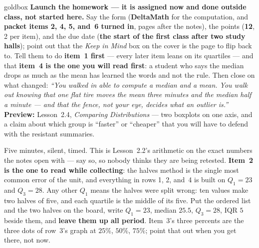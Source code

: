 \documentclass[10pt]{article}
\begin{document}
\boxguard
\begin{skillbox}{goldbox}
\textbf{Launch the homework --- it is assigned now and done outside class, not started here.}
Say the form (\textbf{DeltaMath} for the computation, and \textbf{packet items 2, 4, 5,
and~6 turned in}, pages after the notes), the points (\textbf{12}, 2 per
item), and the due date (\textbf{the start of the first class after two study halls}); point
out that the \emph{Keep in Mind} box on the cover is the page to flip back to. Tell them to do
\textbf{item~1 first} --- every later item leans on its quartiles --- and that \textbf{item~4 is
the one you will read first}: a student who says the median drops as much as the mean has
learned the words and not the rule. Then close on what changed: \emph{``You walked in able to
compute a median and a mean. You walk out knowing that one flat tire moves the mean three
minutes and the median half a minute --- and that the fence, not your eye, decides what an
outlier is.''} \textbf{Preview:} Lesson~2.4, \emph{Comparing Distributions} --- two boxplots
on one axis, and a claim about which group is ``faster'' or ``cheaper'' that you will have to
defend with the resistant summaries.
\end{skillbox}

\begin{teachernote}[Warm-Up]
Five minutes, silent, timed. This is Lesson~2.2's arithmetic on the exact numbers the notes open
with --- say so, so nobody thinks they are being retested. \textbf{Item~2 is the one to read
while collecting}: the halves method is the single most common error of the unit, and
everything in rows 1, 2, and~4 is built on $Q_1 = 23$ and $Q_3 = 28$. Any other $Q_1$ means
the halves were split wrong: ten values make two halves of five, and each quartile is the
middle of its five. Put the ordered list and the two halves on the board, write
$Q_1 = 23$, median $25.5$, $Q_3 = 28$, IQR $5$ beside them, and \textbf{leave them up all
period}. Item~3's three percents are the three dots of row~3's graph at $25\%$, $50\%$, $75\%$;
point that out when you get there, not now.
\end{teachernote}
\end{document}
